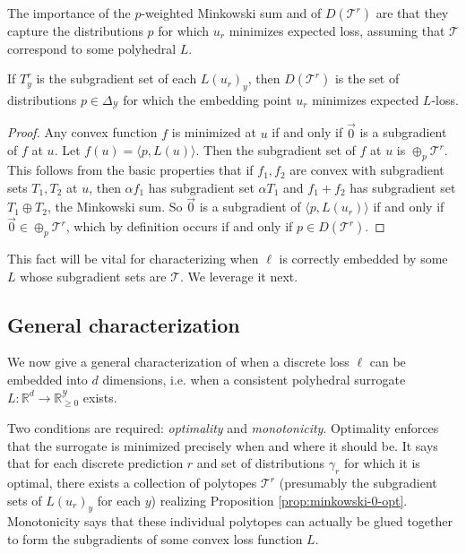 \documentclass[anon]{colt2020} %
\newcommand{\reals}{\mathbb{R}}
\newcommand{\simplex}{\Delta_\Y}
\newcommand{\T}{\mathcal{T}}
\newcommand{\Y}{\mathcal{Y}}
\newcommand{\Opt}{\mathrm{Opt}}
\newcommand{\inprod}[2]{\langle #1, #2 \rangle}%
\begin{document}
The importance of the $p$-weighted Minkowski sum and of $D(\T^r)$ are that they capture the distributions $p$ for which $u_r$ minimizes expected loss, assuming that $\T$ correspond to some polyhedral $L$.
\begin{proposition} \label{prop:minkowski-0-opt}
  If $T^r_y$ is the subgradient set of each $L(u_r)_y$, then $D(\T^r)$ is the set of distributions $p \in \simplex$ for which the embedding point $u_r$ minimizes expected $L$-loss.
\end{proposition}
\begin{proof}
  Any convex function $f$ is minimized at $u$ if and only if $\vec 0$ is a subgradient of $f$ at $u$.
  Let $f(u) = \inprod{p}{L(u)}$.
  Then the subgradient set of $f$ at $u$ is $\oplus_p \T^r$.
  This follows from the basic properties that if $f_1,f_2$ are convex with subgradient sets $T_1,T_2$ at $u$, then $\alpha f_1$ has subgradient set $\alpha T_1$ and $f_1 + f_2$ has subgradient set $T_1 \oplus T_2$, the Minkowski sum.
  So $\vec 0$ is a subgradient of $\inprod{p}{L(u_r)}$ if and only if $\vec 0 \in \oplus_p \T^r$, which by definition occurs if and only if $p \in D(\T^r)$.
\end{proof}
This fact will be vital for characterizing when $\ell$ is correctly embedded by some $L$ whose subgradient sets are $\T$.
We leverage it next.

\subsection{General characterization}

We now give a general characterization of when a discrete loss $\ell$ can be embedded into $d$ dimensions, i.e. when a consistent polyhedral surrogate $L: \reals^d \to \reals^{\Y}_{\geq 0}$ exists.

Two conditions are required: \emph{optimality} and \emph{monotonicity}.
Optimality enforces that the surrogate is minimized precisely when and where it should be.
It says that for each discrete prediction $r$ and set of distributions $\gamma_r$ for which it is optimal, there exists a collection of polytopes $\T^r$ (presumably the subgradient sets of $L(u_r)_y$ for each $y$) realizing Proposition \ref{prop:minkowski-0-opt}.
Monotonicity says that these individual polytopes can actually be glued together to form the subgradients of some convex loss function $L$.

\end{document}
